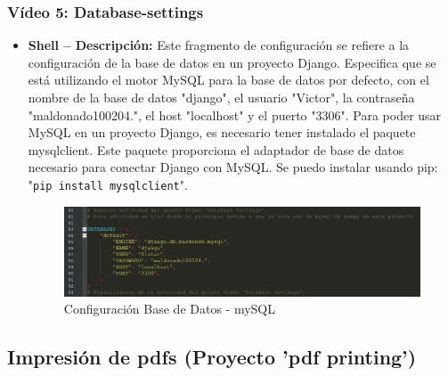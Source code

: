\documentclass{article}
\begin{document}
  \subsubsection{Vídeo 5: Database-settings}
    \begin{itemize}
      \item \textbf{Shell -- Descripción: }Este fragmento de configuración se refiere a la configuración de la base de datos en un proyecto Django. 
        Especifica que se está utilizando el motor MySQL para la base de datos por defecto, con el nombre de la base de datos "django", 
        el usuario "Victor", la contraseña "maldonado100204.", el host "localhost" y el puerto "3306".
        \newline
        Para poder usar MySQL en un proyecto Django, es necesario tener instalado el paquete mysqlclient. Este paquete proporciona el 
        adaptador de base de datos necesario para conectar Django con MySQL. Se puedo instalar usando pip: "\texttt{pip install mysqlclient}".
        \begin{figure}[H]
          \centering
          \includegraphics[width=1\textwidth, keepaspectratio]{img/database.png}
          \caption{Configuración Base de Datos - mySQL}
        \end{figure}
    \end{itemize}
  

  \subsection{Impresión de pdfs (Proyecto 'pdf printing') }
  
\end{document}

